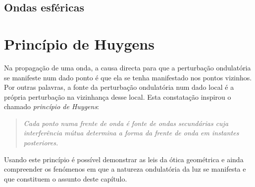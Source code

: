 \subsection{Ondas esféricas}
\tobedone{}



\section{Princípio de Huygens}
Na propagação de uma onda, a causa directa para que a perturbação ondulatória se
manifeste num dado ponto é que ela se tenha manifestado nos pontos vizinhos. Por
outras palavras, a fonte da perturbação ondulatória num dado local é a própria
perturbação na vizinhança desse local. Esta constatação inspirou o chamado
\emph{princípio de Huygens}:
\begin{quote}
    \textsl{Cada ponto numa frente de onda é fonte de ondas secundárias cuja
    interferência mútua determina a forma da frente de onda em instantes
    posteriores.}
\end{quote}
Usando este princípio é possível demonstrar as leis da ótica geométrica e ainda
compreender os fenómenos em que a natureza ondulatória da luz se manifesta e que
constituem o assunto deste capítulo.


\newpage
